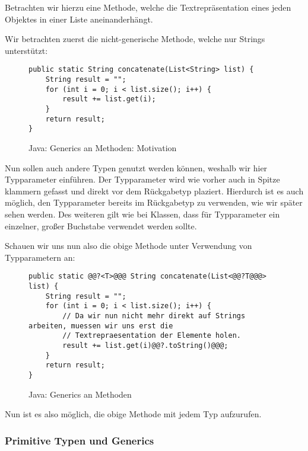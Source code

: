 		Betrachten wir hierzu eine Methode, welche die Textrepräsentation eines jeden Objektes in einer Liste aneinanderhängt.
		
		Wir betrachten zuerst die nicht-generische Methode, welche nur Strings unterstützt:
		\begin{figure}[H]
			\centering
			\begin{lstlisting}[style = base]
public static String concatenate(List<String> list) {
	String result = "";
	for (int i = 0; i < list.size(); i++) {
		result += list.get(i);
	}
	return result;
}
			\end{lstlisting}
			\caption{Java: Generics an Methoden: Motivation}
		\end{figure}
		
		Nun sollen auch andere Typen genutzt werden können, weshalb wir hier Typparameter einführen. Der Typparameter wird wie vorher auch in Spitze klammern gefasst und direkt vor dem Rückgabetyp plaziert. Hierdurch ist es auch möglich, den Typparameter bereits im Rückgabetyp zu verwenden, wie wir später sehen werden. Des weiteren gilt wie bei Klassen, dass für Typparameter ein einzelner, großer Buchstabe verwendet werden sollte.
		
		Schauen wir uns nun also die obige Methode unter Verwendung von Typparametern an:
		\begin{figure}[H]
			\centering
			\begin{lstlisting}[style = base]
public static @@?<T>@@@ String concatenate(List<@@?T@@@> list) {
	String result = "";
	for (int i = 0; i < list.size(); i++) {
		// Da wir nun nicht mehr direkt auf Strings arbeiten, muessen wir uns erst die
		// Textrepraesentation der Elemente holen.
		result += list.get(i)@@?.toString()@@@;
	}
	return result;
}
			\end{lstlisting}
			\caption{Java: Generics an Methoden}
			\label{fig:generics_methoden}
		\end{figure}
		
		Nun ist es also möglich, die obige Methode mit jedem Typ aufzurufen.
	
	\subsubsection{Primitive Typen und Generics}
		\label{sec:generics_primitive_typen}
	

